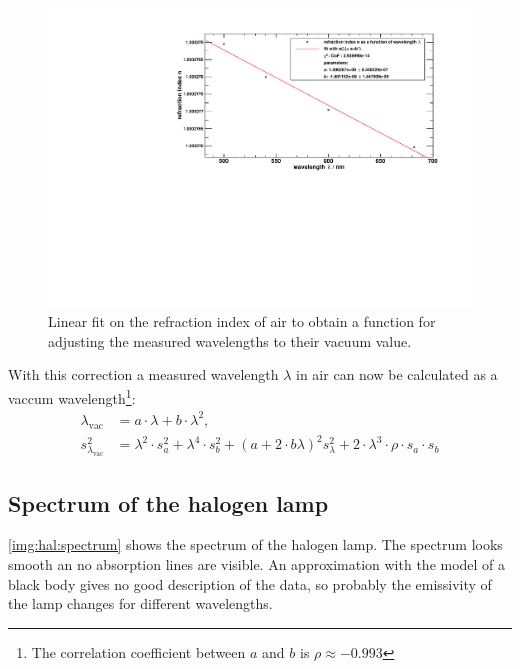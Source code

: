 \begin{figure}[H]
\begin{center}
  \includegraphics[width=\textwidth]{../img/fit_lambda.pdf}
  \caption[---]{Linear fit on the refraction index of air to obtain a function for adjusting
  the measured wavelengths to their vacuum value.}
  \label{img:refindex}
\end{center}
\end{figure}

With this correction a measured wavelength $\lambda$ in air can now be calculated as a vaccum wavelength\footnote{The correlation coefficient between $a$ and $b$ is $\rho \approx -0.993$}:
\begin{equation}
\begin{split}
  \lambda_{\text{vac}} &= a \cdot \lambda + b \cdot \lambda^2, \\
  s_{\lambda_{\text{vac}}}^2 &= 
  \lambda^2 \cdot s_a^2 + \lambda^4 \cdot s_b^2 + (a + 2 \cdot b \lambda)^2 s_{\lambda}^2 + 2 \cdot \lambda^3 \cdot \rho \cdot s_a \cdot s_b
\end{split}
\end{equation}




\subsection{Spectrum of the halogen lamp}

\autoref{img:hal:spectrum} shows the spectrum of the halogen lamp.
The spectrum looks smooth an no absorption lines are visible.
An approximation with the model of a black body gives no good description of the data,
so probably the emissivity of the lamp changes for different wavelengths. 



